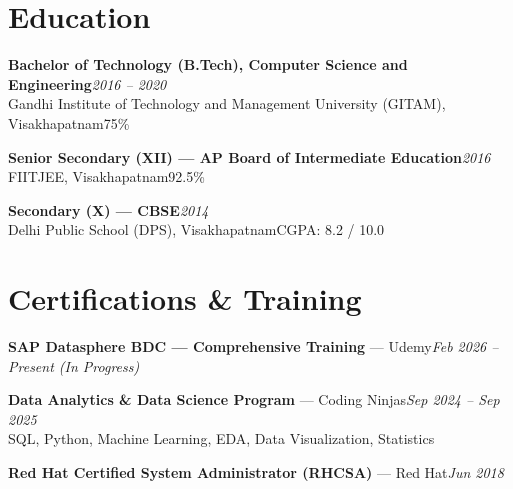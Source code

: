 \documentclass[10pt, letterpaper]{article}
\begin{document}
\section{Education}

{\bfseries Bachelor of Technology (B.Tech), Computer Science and Engineering}\hfill{\small\color{muted}\textit{2016 -- 2020}}\\
{\small\color{muted}Gandhi Institute of Technology and Management University (GITAM), Visakhapatnam\hfill 75\%}

\vspace{2pt}
{\bfseries Senior Secondary (XII) --- AP Board of Intermediate Education}\hfill{\small\color{muted}\textit{2016}}\\
{\small\color{muted}FIITJEE, Visakhapatnam\hfill 92.5\%}

\vspace{2pt}
{\bfseries Secondary (X) --- CBSE}\hfill{\small\color{muted}\textit{2014}}\\
{\small\color{muted}Delhi Public School (DPS), Visakhapatnam\hfill CGPA: 8.2 / 10.0}

\section{Certifications \& Training}

{\bfseries SAP Datasphere BDC --- Comprehensive Training} --- Udemy\hfill{\small\color{muted}\textit{Feb 2026 -- Present \emph{(In Progress)}}}

\vspace{1pt}
{\bfseries Data Analytics \& Data Science Program} --- Coding Ninjas\hfill{\small\color{muted}\textit{Sep 2024 -- Sep 2025}}\\
{\small\color{muted}SQL, Python, Machine Learning, EDA, Data Visualization, Statistics}

\vspace{1pt}
{\bfseries Red Hat Certified System Administrator (RHCSA)} --- Red Hat\hfill{\small\color{muted}\textit{Jun 2018}}

\end{document}
